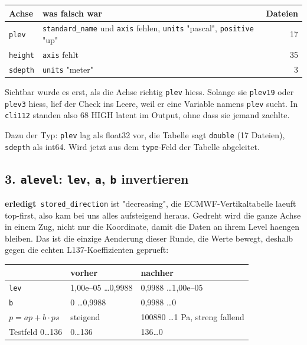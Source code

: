 \documentclass[11pt,a4paper]{article}
\newcommand{\code}[1]{\texttt{\small #1}}
\newcommand{\ok}{\textcolor{green!45!black}{\textbf{erledigt}}}
\begin{document}
\begin{center}
\begin{tabular}{llr}
\toprule
\textbf{Achse} & \textbf{was falsch war} & \textbf{Dateien} \\
\midrule
\code{plev}   & \code{standard\_name} und \code{axis} fehlen, \code{units} "pascal", \code{positive} "up" & 17 \\
\code{height} & \code{axis} fehlt & 35 \\
\code{sdepth} & \code{units} "meter" & 3 \\
\bottomrule
\end{tabular}
\end{center}

Sichtbar wurde es erst, als die Achse richtig \code{plev} hiess. Solange sie
\code{plev19} oder \code{plev3} hiess, lief der Check ins Leere, weil er eine
Variable namens \code{plev} sucht. In \code{cli112} standen also 68 HIGH latent im
Output, ohne dass sie jemand zaehlte.

Dazu der Typ: \code{plev} lag als float32 vor, die Tabelle sagt \code{double}
(17 Dateien), \code{sdepth} als int64. Wird jetzt aus dem \code{type}-Feld der
Tabelle abgeleitet.

\subsection*{3. \code{alevel}: \code{lev}, \code{a}, \code{b} invertieren}
\ok\ \code{stored\_direction} ist "decreasing", die ECMWF-Vertikaltabelle laeuft
top-first, also kam bei uns alles aufsteigend heraus. Gedreht wird die ganze Achse in
einem Zug, nicht nur die Koordinate, damit die Daten an ihrem Level haengen bleiben.
Das ist die einzige Aenderung dieser Runde, die Werte bewegt, deshalb gegen die
echten L137-Koeffizienten geprueft:

\begin{center}
\begin{tabular}{lll}
\toprule
& \textbf{vorher} & \textbf{nachher} \\
\midrule
\code{lev}            & 1{,}00e--05 \dots 0{,}9988 & 0{,}9988 \dots 1{,}00e--05 \\
\code{b}              & 0 \dots 0{,}9988 & 0{,}9988 \dots 0 \\
$p = ap + b \cdot ps$ & steigend & 100880 \dots 1 Pa, streng fallend \\
Testfeld 0\dots136    & 0\dots136 & 136\dots0 \\
\bottomrule
\end{tabular}
\end{center}
\end{document}
